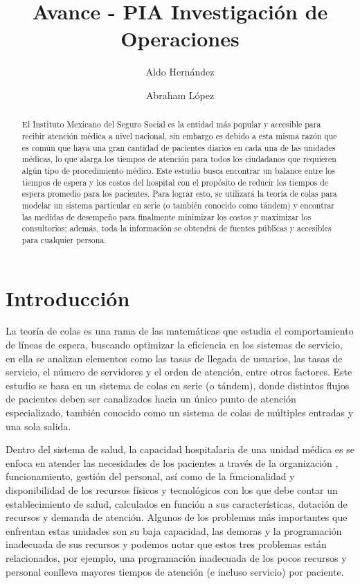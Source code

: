\documentclass[10pt]{article}
\begin{document}
	\begin{opening}
		\title{Avance - PIA Investigación de Operaciones}
		\author[Universidad Autónoma de Nuevo León, San Nicolás de los Garza, aldo.hernandezt@uanl.edu.mx]{Aldo Hernández}
		\author[Universidad Autónoma de Nuevo León, San Nicolás de los Garza, abraham.lopezg@uanl.edu.mx]{Abraham López}
		
		\begin{abstract}
            El Instituto Mexicano del Seguro Social es la entidad más popular y accesible para recibir atención médica a nivel nacional, sin embargo es debido a esta misma razón que es común que haya una gran cantidad de pacientes diarios en cada una de las unidades médicas, lo que alarga los tiempos de atención para todos los ciudadanos que requieren algún tipo de procedimiento médico. Este estudio busca encontrar un balance entre los tiempos de espera y los costos del hospital con el propósito de reducir los tiempos de espera promedio para los pacientes. Para lograr esto, se utilizará la teoría de colas para modelar un sistema particular en serie (o también conocido como tándem) y encontrar las medidas de desempeño para finalmente minimizar los costos y maximizar los consultorios; además, toda la información se obtendrá de fuentes públicas y accesibles para cualquier persona.
		\end{abstract}

	\end{opening}
	
	\section{Introducción}
	La teoría de colas es una rama de las matemáticas que estudia el comportamiento de líneas de espera, buscando optimizar la eficiencia en los sistemas de servicio, en ella se analizan elementos como las tasas de llegada de usuarios, las tasas de servicio, el número de servidores y el orden de atención, entre otros factores. Este estudio se basa en un sistema de colas en serie (o tándem), donde distintos flujos de pacientes deben ser canalizados hacia un único punto de atención especializado, también conocido como un sistema de colas de múltiples entradas y una sola salida.
	
    Dentro del sistema de salud, la capacidad hospitalaria de una unidad médica es se enfoca en atender las necesidades de los pacientes a través de la organización \cite{MEDESK}, funcionamiento, gestión del personal, así como de la funcionalidad y disponibilidad de los recursos físicos y tecnológicos con los que debe contar un establecimiento de salud, calculados en función a sus características, dotación de recursos y demanda de atención. Algunos de los problemas más importantes que enfrentan estas unidades son su baja capacidad, las demoras y la programación inadecuada de sus recursos \cite{MEDESK} y podemos notar que estos tres problemas están relacionados, por ejemplo, una programación inadecuada de los pocos recursos y personal conlleva mayores tiempos de atención (e incluso servicio) por paciente.
    
\end{document}
